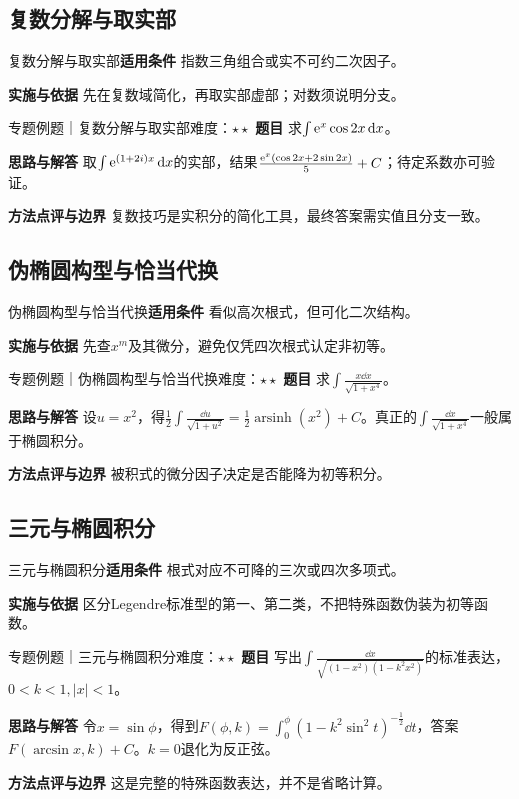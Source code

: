 \subsection{复数分解与取实部}\label{mat:integrals_methods:i28}
\begin{method}{复数分解与取实部}\textbf{适用条件} 指数三角组合或实不可约二次因子。\par\textbf{实施与依据} 先在复数域简化，再取实部虚部；对数须说明分支。\end{method}
\begin{example}{专题例题｜复数分解与取实部}{难度：$\star\star$}
\textbf{题目} 求$\int\mathrm{e}^x\cos2x\mathop{}\!\mathrm{d} x$。\par\textbf{思路与解答} 取$\int\mathrm{e}^{(1+2i)x}\mathop{}\!\mathrm{d} x$的实部，结果$\frac{\mathrm{e}^x(\cos2x+2\sin2x)}{5}+C$；待定系数亦可验证。\par\textbf{方法点评与边界} 复数技巧是实积分的简化工具，最终答案需实值且分支一致。
\end{example}
\subsection{伪椭圆构型与恰当代换}\label{mat:integrals_methods:i29}
\begin{method}{伪椭圆构型与恰当代换}\textbf{适用条件} 看似高次根式，但可化二次结构。\par\textbf{实施与依据} 先查$x^m$及其微分，避免仅凭四次根式认定非初等。\end{method}
\begin{example}{专题例题｜伪椭圆构型与恰当代换}{难度：$\star\star$}
\textbf{题目} 求$\int \frac{x\dd x}{\sqrt{1+x^4}}$。\par\textbf{思路与解答} 设$u=x^2$，得$\frac12\int\frac{\dd u}{\sqrt{1+u^2}}=\frac12\operatorname{arsinh}(x^2)+C$。真正的$\int\frac{\dd x}{\sqrt{1+x^4}}$一般属于椭圆积分。\par\textbf{方法点评与边界} 被积式的微分因子决定是否能降为初等积分。
\end{example}
\subsection{三元与椭圆积分}\label{mat:integrals_methods:i30}
\begin{method}{三元与椭圆积分}\textbf{适用条件} 根式对应不可降的三次或四次多项式。\par\textbf{实施与依据} 区分Legendre标准型的第一、第二类，不把特殊函数伪装为初等函数。\end{method}
\begin{example}{专题例题｜三元与椭圆积分}{难度：$\star\star$}
\textbf{题目} 写出$\int\frac{\dd x}{\sqrt{(1-x^2)(1-k^2x^2)}}$的标准表达，$0<k<1,|x|<1$。\par\textbf{思路与解答} 令$x=\sin\phi$，得到$F(\phi,k)=\int_0^\phi(1-k^2\sin^2t)^{-\frac{1}{2}}\dd t$，答案$F(\arcsin x,k)+C$。$k=0$退化为反正弦。\par\textbf{方法点评与边界} 这是完整的特殊函数表达，并不是省略计算。
\end{example}
